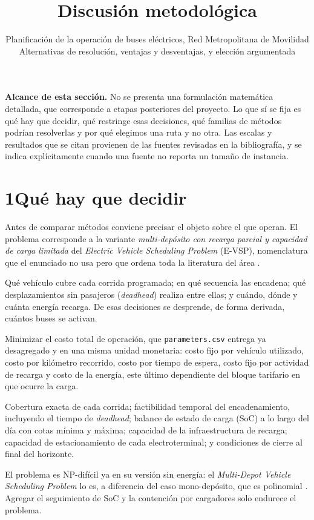 \documentclass[11pt,a4paper,parskip=half]{scrartcl}
\title{Discusión metodológica}
\subtitle{\normalsize Planificación de la operación de buses eléctricos, Red Metropolitana de Movilidad\\[2pt]
Alternativas de resolución, ventajas y desventajas, y elección argumentada}
\author{}
\date{}
\begin{document}
\maketitle
\vspace{-2.2\baselineskip}

\begin{nota}
\textbf{\textcolor{ink}{Alcance de esta sección.}} No se presenta una formulación matemática detallada, que corresponde a etapas posteriores del proyecto. Lo que sí se fija es qué hay que decidir, qué restringe esas decisiones, qué familias de métodos podrían resolverlas y por qué elegimos una ruta y no otra. Las escalas y resultados que se citan provienen de las fuentes revisadas en la bibliografía, y se indica explícitamente cuando una fuente no reporta un tamaño de instancia.
\end{nota}

\section*{1\quad Qué hay que decidir}

Antes de comparar métodos conviene precisar el objeto sobre el que operan. El problema corresponde a la variante \textit{multi-depósito con recarga parcial y capacidad de carga limitada} del \textit{Electric Vehicle Scheduling Problem} (E-VSP), nomenclatura que el enunciado no usa pero que ordena toda la literatura del área \citep{perumal_evspreview_2022}.

\begin{campos}
\item[Decisiones] Qué vehículo cubre cada corrida programada; en qué secuencia las encadena; qué desplazamientos sin pasajeros (\textit{deadhead}) realiza entre ellas; y cuándo, dónde y cuánta energía recarga. De esas decisiones se desprende, de forma derivada, cuántos buses se activan.
\item[Objetivo] Minimizar el costo total de operación, que \texttt{parameters.csv} entrega ya desagregado y en una misma unidad monetaria: costo fijo por vehículo utilizado, costo por kilómetro recorrido, costo por tiempo de espera, costo fijo por actividad de recarga y costo de la energía, este último dependiente del bloque tarifario en que ocurre la carga.
\item[Restricciones] Cobertura exacta de cada corrida; factibilidad temporal del encadenamiento, incluyendo el tiempo de \textit{deadhead}; balance de estado de carga (SoC) a lo largo del día con cotas mínima y máxima; capacidad de la infraestructura de recarga; capacidad de estacionamiento de cada electroterminal; y condiciones de cierre al final del horizonte.
\item[Naturaleza] El problema es NP-difícil ya en su versión sin energía: el \textit{Multi-Depot Vehicle Scheduling Problem} lo es, a diferencia del caso mono-depósito, que es polinomial \citep{kliewer_timespacemdvsp_2006}. Agregar el seguimiento de SoC y la contención por cargadores solo endurece el problema.
\end{campos}
\end{document}
